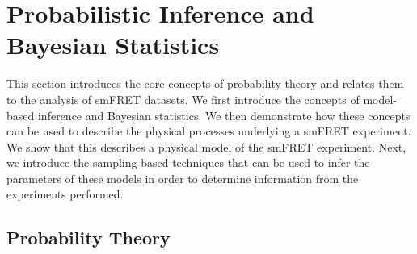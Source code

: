 




\section{Probabilistic Inference and Bayesian Statistics}
\label{sect:bayes_infer}
This section introduces the core concepts of probability theory and relates them to the analysis of smFRET datasets. We first introduce the concepts of model-based inference and Bayesian statistics. We then demonstrate how these concepts can be used to describe the physical processes underlying a smFRET experiment. We show that this describes a physical model of the smFRET experiment. Next, we introduce the sampling-based techniques that can be used to infer the parameters of these models in order to determine information from the experiments performed.   

\subsection{Probability Theory}
